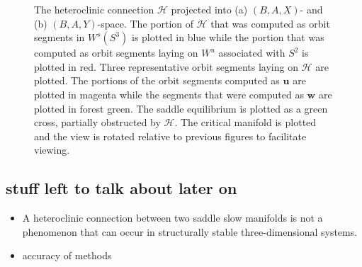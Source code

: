 \documentclass{ws-ijbc}
\begin{document}
\begin{figure}[ht]
\centering
{}
\caption{The heteroclinic connection $\mathscr{H}$ projected into (a) $(B,A,X)$- and (b) $(B,A,Y)$-space.  The portion of $\mathscr{H}$ that was computed as orbit segments in $W^s(S^3)$ is plotted in blue while the portion that was computed as orbit segments laying on $W^u$ associated with $S^2$ is plotted in red.  Three representative orbit segments laying on $\mathscr{H}$ are plotted.  The portions of the orbit segments computed as $\mathbf{u}$ are plotted in magenta while the segments that were computed as $\mathbf{w}$ are plotted in forest green.  The saddle equilibrium is plotted as a green cross, partially obstructed by $\mathscr{H}$.  The critical manifold is plotted and the view is rotated relative to previous figures to facilitate viewing.}
\label{heteroclinic}
\end{figure}

\subsection{stuff left to talk about later on}
\begin{itemize}
    \item A heteroclinic connection between two saddle slow manifolds is not a phenomenon that can occur in structurally stable three-dimensional systems. \cite{jacobs2014unified}
    \item accuracy of methods
\end{itemize}


\end{document}
